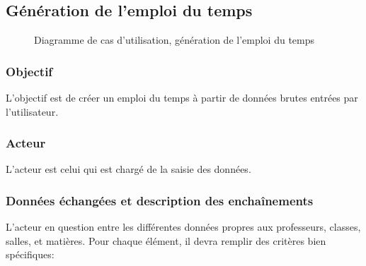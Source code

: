\documentclass[12pt,a4paper,french]{article}
\begin{document}
\subsection{Génération de l'emploi du temps}    
\begin{figure}[! ht ]
    \centering
    \begin{minipage}[t]{14 cm}
        \centering
        \caption {Diagramme de cas d'utilisation, génération de l'emploi du temps}
    \end{minipage}
\end{figure}
            
\subsubsection{Objectif}
L'objectif est de créer un emploi du temps à partir de données brutes entrées par l'utilisateur.

\subsubsection{Acteur}
L'acteur est celui qui est chargé de la saisie des données.
        
\subsubsection{Données échangées et description des enchaînements}    
L'acteur en question entre les différentes données propres aux professeurs, classes, salles, et matières. Pour chaque élément, il devra remplir des critères bien spécifiques:
\end{document}
